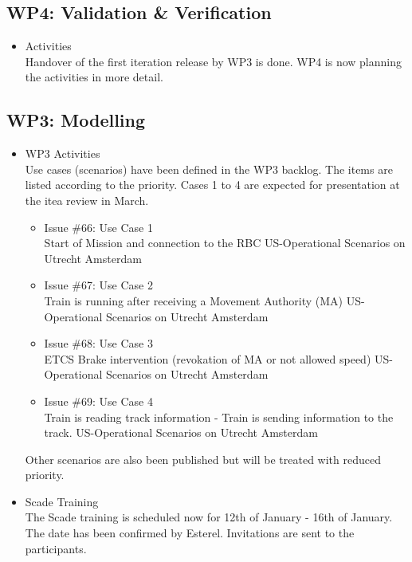 \documentclass[a4paper, 11pt]{article}
\begin{document}
\subsection{WP4: Validation \& Verification}
\begin{itemize}
\item Activities\\
Handover of the first iteration release by WP3 is done. WP4 is now planning the activities in more detail.

\end{itemize}

\subsection{WP3: Modelling}


\begin{itemize}
\item WP3 Activities\\
Use cases (scenarios) have been defined in the WP3 backlog. The items are listed according to the priority. Cases 1 to 4 are expected for presentation at the itea review in March.

\begin{itemize}
\item Issue \#66: Use Case 1\\
Start of Mission and connection to the RBC  US-Operational Scenarios on Utrecht Amsterdam

\item Issue \#67: Use Case 2\\
Train is running after receiving a Movement Authority (MA) US-Operational Scenarios on Utrecht Amsterdam

\item Issue \#68: Use Case 3\\
ETCS Brake intervention (revokation of MA or not allowed speed) US-Operational Scenarios on Utrecht Amsterdam

\item Issue \#69: Use Case 4\\
Train is reading track information - Train is sending information to the track. US-Operational Scenarios on Utrecht Amsterdam
\end{itemize}

Other scenarios are also been published but will be treated with reduced priority.
 
\item Scade Training\\
The Scade training is scheduled now for 12th of January - 16th of January.
The date has been confirmed by Esterel. Invitations are sent to the participants.

\end{itemize}
\end{document}
